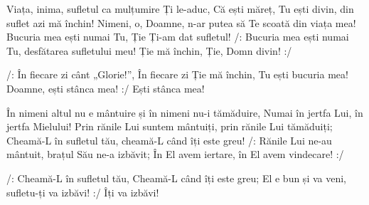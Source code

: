 \beginverse
Viața, inima, sufletul ca mulțumire Ți le-aduc,
Că ești măreț, Tu ești divin, din suflet azi mă închin!
Nimeni, o, Doamne, n-ar putea să Te scoată din viața mea!
Bucuria mea ești numai Tu, Ție Ți-am dat sufletul!
/: Bucuria mea ești numai Tu, desfătarea sufletului meu!
Ție mă închin, Ție, Domn divin! :/
\endverse

\beginchorus
/: În fiecare zi cânt „Glorie!”,
În fiecare zi Ție mă închin,
Tu ești bucuria mea!
Doamne, ești stânca mea! :/
Ești stânca mea!
\endchorus

\beginverse
În nimeni altul nu e mântuire și în nimeni nu-i tămăduire,
Numai în jertfa Lui, în jertfa Mielului!
Prin rănile Lui suntem mântuiți, prin rănile Lui tămăduiți;
Cheamă-L în sufletul tău, cheamă-L când îți este greu!
/: Rănile Lui ne-au mântuit, brațul Său ne-a izbăvit;
În El avem iertare, în El avem vindecare! :/
\endverse

\beginverse*
/: Cheamă-L în sufletul tău,
Cheamă-L când îți este greu;
El e bun și va veni, sufletu-ți va izbăvi! :/
Îți va izbăvi!
\endverse
\endsong